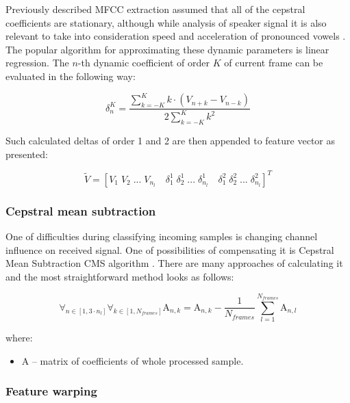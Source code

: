 \documentclass[magister]{dyplom}
\begin{document}
	Previously described \gls{MFCC} extraction assumed that all of the cepstral coefficients are stationary, although while analysis of speaker signal it is also relevant to take into consideration speed and acceleration of pronounced vowels \cite{SpeechAnalysis}. The popular algorithm for approximating these dynamic parameters is linear regression. The $n$-th dynamic coefficient of order $K$ of current frame can be evaluated in the following way:
	
	\begin{equation}
		\delta^K_n = \frac{\sum_{k=-K}^{K} k \cdot (V_{n+k} - V_{n-k})}{2 \sum_{k=-K}^{K} k^2}
	\end{equation}
	
	Such calculated deltas of order 1 and 2 are then appended to feature vector as presented:
	
	\begin{equation}
		\tilde{V} = [V_1 \; V_2 \; ... \; V_{n_l} \quad \delta^1_1 \; \delta^1_2 \; ... \; \delta^1_{n_l} \quad \delta^2_1 \; \delta^2_2 \; ... \; \delta^2_{n_l}]^T
	\end{equation}
	
	\subsubsection{Cepstral mean subtraction}
	
	One of difficulties during classifying incoming samples is changing channel influence on received signal. One of possibilities of compensating it is Cepstral Mean Subtraction \gls{CMS} algorithm \cite{CepstralMeans}. There are many approaches of calculating it and the most straightforward method looks as follows:
	
	\begin{equation}
		\forall_{n \in [1, 3 \cdot n_l]} \forall_{k \in [1,N_{frames}]} \mathrm{A}_{n,k} = \mathrm{A}_{n,k} - \frac{1}{N_{frames}} \sum_{l=1}^{N_{frames}} \mathrm{A}_{n,l}
	\end{equation}
	
	where:
	
	\begin{itemize}
		\item $\mathrm{A}$ -- matrix of coefficients of whole processed sample.
	\end{itemize}
	
	\subsubsection{Feature warping}
	
\end{document}
